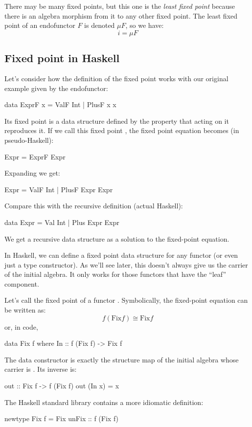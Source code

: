 \documentclass[DaoFP]{subfiles}
\begin{document}
There may be many fixed points, but this one is the \emph{least fixed point} because there is an algebra morphism from it to any other fixed point. The least fixed point of an endofunctor $F$ is denoted $\mu F$, so we have:
\[ i = \mu F \]
\subsection{Fixed point in Haskell}
Let's consider how the definition of the fixed point works with our original example given by the endofunctor:
\begin{haskell}
data ExprF x = ValF Int | PlusF x x
\end{haskell}
Its fixed point is a data structure defined by the property that  acting on it reproduces it. If we call this fixed point , the fixed point equation becomes  (in pseudo-Haskell):
\begin{haskell}
Expr = ExprF Expr
\end{haskell}
Expanding  we get:
\begin{haskell}
Expr = ValF Int | PlusF Expr Expr
\end{haskell}
Compare this with the recursive definition (actual Haskell):
\begin{haskell}
data Expr = Val Int | Plus Expr Expr
\end{haskell}
We get a recursive data structure as a solution to the fixed-point equation.

In Haskell, we can define a fixed point data structure for any functor (or even just a type constructor). As we'll see later, this doesn't always give us the carrier of the initial algebra. It only works for those functors that have the ``leaf'' component.

Let's call  the fixed point of a functor . Symbolically, the fixed-point equation can be written as:
\[f ( \text{Fix} f) \cong  \text{Fix} f \]
or, in code,
\begin{haskell}
data Fix f where
  In :: f (Fix f) -> Fix f
\end{haskell}
The data constructor  is exactly the structure map of the initial algebra whose carrier is . Its inverse is:
\begin{haskell}
out :: Fix f -> f (Fix f)
out (In x) = x
\end{haskell}
The Haskell standard library contains a more idiomatic definition:
\begin{haskell}
newtype Fix f = Fix { unFix :: f (Fix f) }
\end{haskell}
\end{document}
